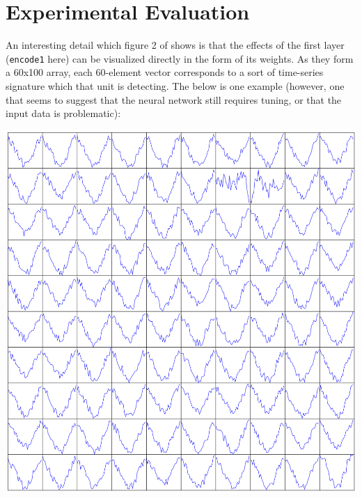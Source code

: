 \documentclass[journal]{IEEEtran}
\begin{document}


\section{Experimental Evaluation}

An interesting detail which figure 2 of \cite{Lasko2013} shows is that
the effects of the first layer (\texttt{encode1} here) can be
visualized directly in the form of its weights.  As they form a 60x100
array, each 60-element vector corresponds to a sort of time-series
signature which that unit is detecting.  The below is one example
(however, one that seems to suggest that the neural network still
requires tuning, or that the input data is problematic):

\includegraphics[width=\linewidth]{keras_1st_layer.png}
\end{document}
